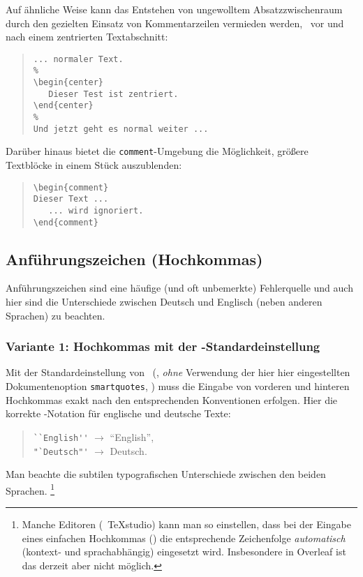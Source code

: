 \begin{sloppypar}
\noindent
Auf ähnliche Weise kann das Entstehen von ungewolltem Absatzzwischenraum durch 
den gezielten Einsatz von Kommentarzeilen vermieden werden, \zB\ vor und nach einem zentrierten
Textabschnitt:
\end{sloppypar}
%
\begin{quote}
\begin{verbatim}
... normaler Text.
%
\begin{center}
   Dieser Test ist zentriert.
\end{center}
%
Und jetzt geht es normal weiter ...
\end{verbatim}
\end{quote}
%
Darüber hinaus bietet die \verb!comment!-Umgebung die Möglichkeit, größere Text\-blöcke
in einem Stück auszublenden:
%
\begin{quote}
\begin{verbatim}
\begin{comment}
Dieser Text ...
   ... wird ignoriert.
\end{comment}
\end{verbatim}
\end{quote}




\subsection{Anführungszeichen (Hochkommas)}
\label{sec:anfuehrungszeichen}

Anführungszeichen sind eine häufige (und oft unbemerkte) Fehlerquelle und auch hier sind die Unterschiede zwischen Deutsch und Englisch (neben anderen Sprachen) zu beachten.


\subsubsection{Variante 1: Hochkommas mit der \latex-Standardeinstellung}

Mit der Standardeinstellung von \latex\ (\dah, \emph{ohne} Verwendung der 
hier hier eingestellten Dokumentenoption \texttt{\texttt{smartquotes}}, \su)
muss die Eingabe von vorderen und hinteren Hochkommas exakt nach den entsprechenden
Konventionen erfolgen.
Hier die korrekte \latex-Notation für englische und deutsche Texte:
%
\begin{quote}
\verb!``English''! $\rightarrow$ ``English'',\\
\verb!"`Deutsch"'! $\rightarrow$ {\glqq}Deutsch{\grqq}.
\end{quote}
%
Man beachte die subtilen typografischen Unterschiede zwischen den beiden Sprachen.%
\footnote{Manche Editoren (\zB\ \textsf{TeXstudio}) kann man so einstellen, dass
bei der Eingabe eines einfachen Hochkommas (\texttt{\textquotedbl}) die entsprechende Zeichenfolge 
\emph{automatisch} (kontext- und sprachabhängig) eingesetzt wird.
Insbesondere in \textsf{Overleaf} ist das derzeit aber nicht möglich.}

